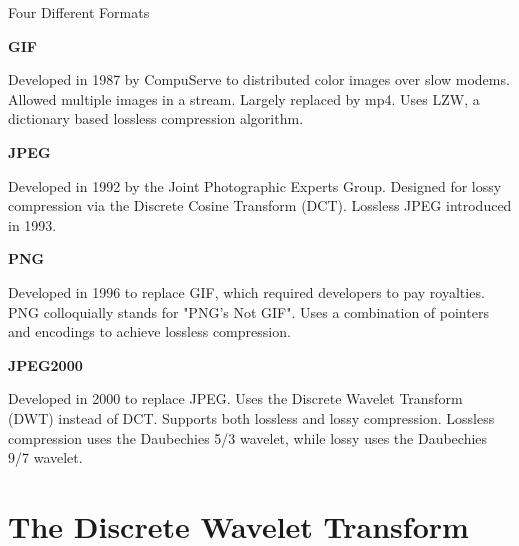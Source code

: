 \documentclass[9pt]{beamer}
\begin{document}
\begin{frame}{Four Different Formats}
	\begin{multicols*}{2}
		\textbf{GIF}

		Developed in 1987 by CompuServe to
		distributed color images over slow modems.
		Allowed multiple images in a stream.
		Largely replaced by mp4.
		Uses LZW, a dictionary based lossless 
		compression algorithm.

		\vspace{1cm}

		\textbf{JPEG}

		Developed in 1992 by the
		Joint Photographic Experts Group.
		Designed for lossy compression via the
		Discrete Cosine Transform (DCT).
		Lossless JPEG introduced in 1993.

		\columnbreak

		\textbf{PNG}

		Developed in 1996 to replace GIF,
		which required developers to pay royalties.
		PNG colloquially stands for "PNG's Not GIF".
		Uses a combination of pointers and encodings
		to achieve lossless compression.

		\vspace{1cm}

		\textbf{JPEG2000}

		Developed in 2000 to replace JPEG.
		Uses the Discrete Wavelet Transform (DWT)
		instead of DCT. Supports both lossless and
		lossy compression. Lossless compression 
		uses the Daubechies 5/3 wavelet, while lossy
		uses the Daubechies 9/7 wavelet.
		
	\end{multicols*}

\end{frame}

\section{The Discrete Wavelet Transform}
\end{document}
